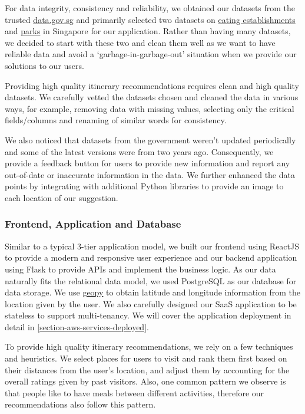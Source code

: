 \documentclass[12pt,a4paper]{article}
\begin{document}
        For data integrity, consistency and reliability, we obtained our datasets from the trusted \url{data.gov.sg} and primarily selected two datasets on \href{https://data.gov.sg/dataset/eating-establishments}{eating establishments} and \href{https://data.gov.sg/dataset/parks}{parks} in Singapore for our application. Rather than having many datasets, we decided to start with these two and clean them well as we want to have reliable data and avoid a ‘garbage-in-garbage-out’ situation when we provide our solutions to our users.

        Providing high quality itinerary recommendations requires clean and high quality datasets. We carefully vetted the datasets chosen and cleaned the data in various ways, for example, removing data with missing values, selecting only the critical fields/columns and renaming of similar words for consistency.
        
        We also noticed that datasets from the government weren’t updated periodically and some of the latest versions were from two years ago. Consequently, we provide a feedback button for users to provide new information and report any out-of-date or inaccurate information in the data. We further enhanced the data points by integrating with additional Python libraries to provide an image to each location of our suggestion.


        \subsubsection{Frontend, Application and Database}
        
        Similar to a typical 3-tier application model, we built our frontend using ReactJS to provide a modern and responsive user experience and our backend application using Flask to provide APIs and implement the business logic. As our data naturally fits the relational data model, we used PostgreSQL as our database for data storage. We use \href{https://geopy.readthedocs.io/en/stable/}{geopy} to obtain latitude and longitude information from the location given by the user. We also carefully designed our SaaS application to be stateless to support multi-tenancy. We will cover the application deployment in detail in \autoref{section-aws-services-deployed}.

        To provide high quality itinerary recommendations, we rely on a few techniques and heuristics. We select places for users to visit and rank them first based on their distances from the user’s location, and adjust them by accounting for the overall ratings given by past visitors. Also, one common pattern we observe is that people like to have meals between different activities, therefore our recommendations also follow this pattern.
\end{document}
